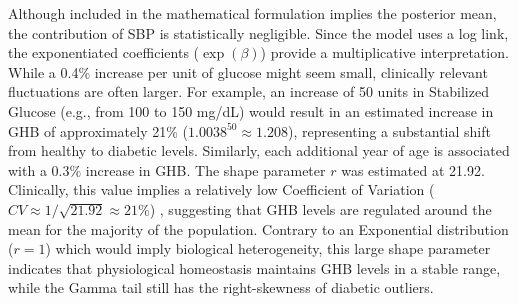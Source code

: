 Although included in the mathematical formulation implies the posterior mean, the contribution of SBP is statistically negligible. Since the model uses a log link, the exponentiated coefficients ($\exp(\beta)$) provide a multiplicative interpretation. While a 0.4\% increase per unit of glucose might seem small, clinically relevant fluctuations are often larger. For example, an increase of 50 units in Stabilized Glucose (e.g., from 100 to 150 mg/dL) would result in an estimated increase in GHB of approximately 21\% ($1.0038^{50} \approx 1.208$), representing a substantial shift from healthy to diabetic levels. Similarly, each additional year of age is associated with a $0.3\%$ increase in GHB. The shape parameter $r$ was estimated at 21.92. Clinically, this value implies a relatively low Coefficient of Variation ($CV \approx 1/\sqrt{21.92} \approx 21\%$) \cite{gelman2013}, suggesting that GHB levels are regulated around the mean for the majority of the population. Contrary to an Exponential distribution ($r=1$) which would imply biological heterogeneity, this large shape parameter indicates that physiological homeostasis maintains GHB levels in a stable range, while the Gamma tail still has the right-skewness of diabetic outliers.